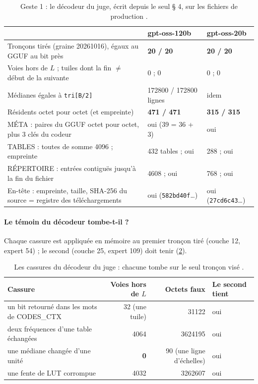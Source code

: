 \begin{table}[ht]
\centering\small
\caption[Geste 1 : un troisième décodeur depuis le seul § 4]{Geste 1 : le décodeur du juge, écrit depuis le seul § 4, sur les fichiers de production \mes.}
\label{t2e-tab:geste1}
\begin{tabularx}{\linewidth}{@{}>{\raggedright\arraybackslash}Xll@{}}
\toprule
& gpt-oss-120b & gpt-oss-20b \\
\midrule
Tronçons tirés (graine 20261016), égaux au GGUF au bit près & \textbf{20 / 20} & \textbf{20 / 20} \\
Voies hors de $L$ ; tuiles dont la fin $\ne$ début de la suivante & 0 ; 0 & 0 ; 0 \\
Médianes égales à \texttt{tri[B/2]} & \num{172800} / \num{172800} lignes & idem \\
Résidents octet pour octet (et empreinte) & \textbf{471 / 471} & \textbf{315 / 315} \\
MÉTA : paires du GGUF octet pour octet, plus 3 clés du codeur & oui (39 = 36 + 3) & oui \\
TABLES : toutes de somme \num{4096} ; empreinte & 432 tables ; oui & 288 ; oui \\
RÉPERTOIRE : entrées contiguës jusqu'à la fin du fichier & \num{4608} ; oui & 768 ; oui \\
En-tête : empreinte, taille, SHA-256 du source = registre des téléchargements & oui (\texttt{582bd40f}…) & oui (\texttt{27cd6c43}…) \\
\bottomrule
\end{tabularx}
\end{table}

\paragraph{Le témoin du décodeur tombe-t-il ?} Chaque cassure est appliquée en mémoire au premier tronçon tiré (couche 12, expert 54) ; le second (couche 25, expert 109) doit tenir (\cref{t2e-tab:cassures-dec}).

\begin{table}[ht]
\centering\footnotesize
\caption[Les cassures du décodeur du juge]{Les cassures du décodeur du juge : chacune tombe sur le seul tronçon visé \mes.}
\label{t2e-tab:cassures-dec}
\begin{tabular}{@{}lrrl@{}}
\toprule
Cassure & Voies hors de $L$ & Octets faux & Le second tient \\
\midrule
un bit retourné dans les mots de CODES\_CTX & 32 (une tuile) & \num{31122} & oui \\
deux fréquences d'une table échangées & \num{4064} & \num{3624195} & oui \\
une médiane changée d'une unité & \textbf{0} & 90 (une ligne d'échelles) & oui \\
une fente de LUT corrompue & \num{4032} & \num{3262607} & oui \\
\bottomrule
\end{tabular}
\end{table}

